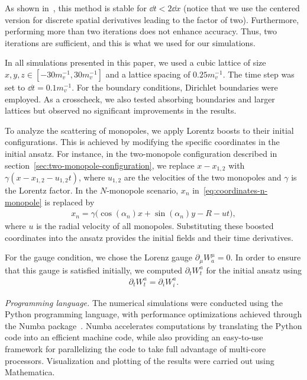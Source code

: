 \documentclass[aps, prd, twocolumn, superscriptaddress, preprintnumbers, nofootinbib, longbibliography]{revtex4-1}
\begin{document}
As shown in~\cite{Teukolsky:1999rm}, this method is stable for $\dd t < 2 \dd x$ (notice that we use the centered version for discrete spatial derivatives leading to the factor of two). Furthermore, performing more than two iterations does not enhance accuracy. Thus, two iterations are sufficient, and this is what we used for our simulations.

In all simulations presented in this paper, we used a cubic lattice of size $x, y, z \in [-30 m_v^{-1}, 30 m_v^{-1}]$ and a lattice spacing of $0.25 m_v^{-1}$. The time step was set to $\dd t = 0.1 m_v^{-1}$. For the boundary conditions, Dirichlet boundaries were employed.
As a crosscheck, we also tested absorbing boundaries and larger lattices but observed no significant improvements in the results.

To analyze the scattering of monopoles, we apply Lorentz boosts to their initial configurations. This is achieved by modifying the specific coordinates in the initial ansatz. For instance, in the two-monopole configuration described in section~\ref{sec:two-monopole-configuration}, we replace $x - x_{1,2}$ with $\gamma (x - x_{1,2} - u_{1,2}t)$, where $u_{1,2}$ are the velocities of the two monopoles and $\gamma$ is the Lorentz factor.
In the $N$-monopole scenario, $x_n$ in~\eqref{eq:coordinates-n-monopole} is replaced by
\begin{align*}
    x_n = \gamma \big( \cos(\alpha_n)x + \sin(\alpha_n)y - R - ut \big),
\end{align*}
where $u$ is the radial velocity of all monopoles.
Substituting these boosted coordinates into the ansatz provides the initial fields and their time derivatives.

For the gauge condition, we chose the Lorenz gauge $\partial_\mu W^\mu_a = 0$. In order to ensure that this gauge is satisfied initially, we computed $\partial_t W^a_t$ for the initial ansatz using
\begin{align*}
\partial_t W^a_t = \partial_i W^a_i.
\end{align*}

\textit{Programming language.}
The numerical simulations were conducted using the Python programming language, with performance optimizations achieved through the Numba package~\cite{Numba}. Numba accelerates computations by translating the Python code into an efficient machine code, while also providing an easy-to-use framework for parallelizing the code to take full advantage of multi-core processors. Visualization and plotting of the results were carried out using Mathematica.









    
\setlength{\bibsep}{4pt}

\end{document}
